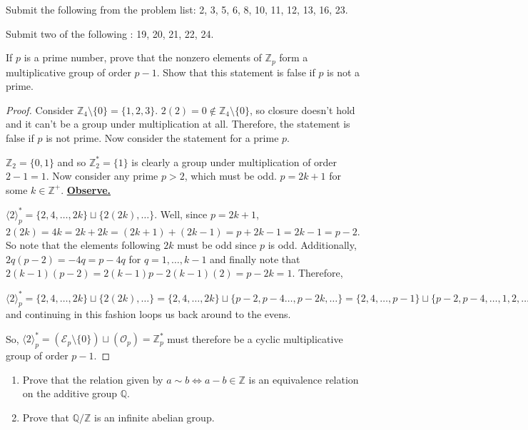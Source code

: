 \documentclass[addpoints,10pt]{exam}
\theoremstyle{plain}
\theoremstyle{definition}
\newtheorem{prob}[thm]{Problem}
\theoremstyle{plain}
\theoremstyle{plain}
\theoremstyle{definition}
\let\oldprob\prob
\let\endoldprob\endprob
\renewenvironment{prob}
  {\begin{singlespace}\oldprob}
  {\endoldprob\end{singlespace}}
\newcommand{\belowtitle}{\leavevmode\newline}
\newcommand{\ZZ}{\ensuremath{\mathbb{Z}}}
\begin{document}
Submit the following from the problem list: 2, 3, 5, 6, 8, 10, 11, 12, 13, 16, 23.

Submit two of the following : 19, 20, 21, 22, 24.

\begin{prob}
If $p$ is a prime number, prove that the nonzero elements of $\mathbb{Z}_p$ form a multiplicative group of order $p-1$. Show that this statement is false if $p$ is not a prime.
\end{prob}

    \begin{proof} Consider $\ZZ_{4}\setminus\{0\}=\{1,2,3\}$. $2(2)=0\not\in \ZZ_{4}\setminus\{0\}$, so closure doesn't hold and it can't be a group under multiplication at all. Therefore, the statement is false if $p$ is not prime. Now consider the statement for a prime $p$.
        
    $\ZZ_{2}=\{0,1\}$ and so $\ZZ^{*}_{2}=\{1\}$ is clearly a group under multiplication of order $2-1=1$. Now consider any prime $p>2$, which must be odd. $p=2k+1$ for some $k\in \ZZ^{+}$. \underline{\textbf{Observe.}}

    $\langle 2\rangle^{*}_{p}=\{2,4,\hdots, 2k\}\sqcup \{2(2k),\hdots\}$. Well, since $p=2k+1$, $2(2k)=4k=2k+2k=(2k+1)+(2k-1)=p+2k-1=2k-1=p-2$. So note that the elements following $2k$ must be odd since $p$ is odd. Additionally, $2q(p-2)=-4q=p-4q$ for $q=1,\hdots, k-1$ and finally note that $2(k-1)(p-2)=2(k-1)p-2(k-1)(2)=p-2k=1$. Therefore,

    $\langle 2\rangle^{*}_{p}=\{2,4,\hdots, 2k\}\sqcup \{2(2k),\hdots\}=\{2,4,\hdots, 2k\}\sqcup \{p-2,p-4\hdots,p-2k,\hdots\}=\{2,4,\hdots,p-1\}\sqcup \{p-2,p-4,\hdots,1,2,\hdots\}.$ and continuing in this fashion loops us back around to the evens.

    So, $\langle 2\rangle^{*}_{p}=(\mathcal{E}_{p}\setminus\{0\})\sqcup (\mathcal{O}_{p})=\ZZ^{*}_{p}$ must therefore be a cyclic multiplicative group of order $p-1$.

\end{proof}
\newpage
\begin{prob}\belowtitle
\begin{enumerate}[label=(\alph*)]
\item Prove that the relation given by $a \sim b \iff a - b \in \mathbb{Z}$ is an equivalence relation on the additive group $\mathbb{Q}$.
\item Prove that $\mathbb{Q}/\mathbb{Z}$ is an infinite abelian group.
\end{enumerate}
\end{prob}
\end{document}
